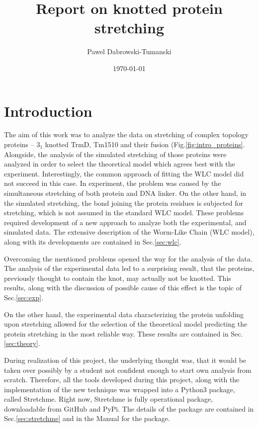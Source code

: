 \documentclass[11pt]{article}
\title{Report on knotted protein stretching}
\author{Pawel Dabrowski-Tumanski}
\date{\today}
\begin{document}
\maketitle

\section*{Introduction}
\label{sec:intro}
The aim of this work was to analyze the data on stretching of complex topology proteins -- $3_1$ knotted TrmD, Tm1510 and their fusion (Fig.\ref{fig:intro_proteins}.
Alongside, the analysis of the simulated stretching of those proteins were analyzed in order to select the theoretical model which agrees best with the experiment.
Interestingly, the common approach of fitting the WLC model did not succeed in this case.
In experiment, the problem was caused by the simultaneous stretching of both protein and DNA linker.
On the other hand, in the simulated stretching, the bond joining the protein residues is subjected for stretching, which is not assumed in the standard WLC model.
These problems required development of a new approach to analyze both the experimental, and simulated data.
The extensive description of the Worm-Like Chain (WLC model), along with its developments are contained in Sec.\ref{sec:wlc}.

Overcoming the mentioned problems opened the way for the analysis of the data. The analysis of the experimental data led to a surprising result, that the proteins, previously thought to contain the knot, may actually not be knotted.
This results, along with the discussion of possible cause of this effect is the topic of Sec.\ref{sec:exp}.

On the other hand, the experimental data characterizing the protein unfolding upon stretching allowed for the selection of the theoretical model predicting the protein stretching in the most reliable way. These results are contained in Sec.\ref{sec:theory}.

During realization of this project, the underlying thought was, that it would be taken over possibly by a student not confident enough to start own analysis from scratch.
Therefore, all the tools developed during this project, along with the implementation of the new technique was wrapped into a Python3 package, called Stretchme.
Right now, Stretchme is fully operational package, downloadable from GitHub and PyPi.
The details of the package are contained in Sec.\ref{sec:stretchme} and in the Manual for the package.
\end{document}
